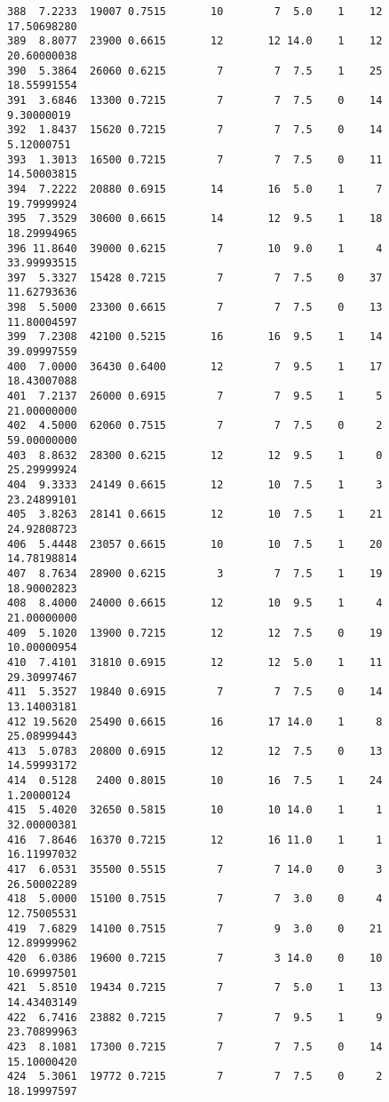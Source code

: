 \documentclass[
  letterpaper,
  DIV=11,
  numbers=noendperiod]{scrreprt}
\begin{document}
\begin{verbatim}
388  7.2233  19007 0.7515       10        7  5.0    1    12 17.50698280
389  8.8077  23900 0.6615       12       12 14.0    1    12 20.60000038
390  5.3864  26060 0.6215        7        7  7.5    1    25 18.55991554
391  3.6846  13300 0.7215        7        7  7.5    0    14  9.30000019
392  1.8437  15620 0.7215        7        7  7.5    0    14  5.12000751
393  1.3013  16500 0.7215        7        7  7.5    0    11 14.50003815
394  7.2222  20880 0.6915       14       16  5.0    1     7 19.79999924
395  7.3529  30600 0.6615       14       12  9.5    1    18 18.29994965
396 11.8640  39000 0.6215        7       10  9.0    1     4 33.99993515
397  5.3327  15428 0.7215        7        7  7.5    0    37 11.62793636
398  5.5000  23300 0.6615        7        7  7.5    0    13 11.80004597
399  7.2308  42100 0.5215       16       16  9.5    1    14 39.09997559
400  7.0000  36430 0.6400       12        7  9.5    1    17 18.43007088
401  7.2137  26000 0.6915        7        7  9.5    1     5 21.00000000
402  4.5000  62060 0.7515        7        7  7.5    0     2 59.00000000
403  8.8632  28300 0.6215       12       12  9.5    1     0 25.29999924
404  9.3333  24149 0.6615       12       10  7.5    1     3 23.24899101
405  3.8263  28141 0.6615       12       10  7.5    1    21 24.92808723
406  5.4448  23057 0.6615       10       10  7.5    1    20 14.78198814
407  8.7634  28900 0.6215        3        7  7.5    1    19 18.90002823
408  8.4000  24000 0.6615       12       10  9.5    1     4 21.00000000
409  5.1020  13900 0.7215       12       12  7.5    0    19 10.00000954
410  7.4101  31810 0.6915       12       12  5.0    1    11 29.30997467
411  5.3527  19840 0.6915        7        7  7.5    0    14 13.14003181
412 19.5620  25490 0.6615       16       17 14.0    1     8 25.08999443
413  5.0783  20800 0.6915       12       12  7.5    0    13 14.59993172
414  0.5128   2400 0.8015       10       16  7.5    1    24  1.20000124
415  5.4020  32650 0.5815       10       10 14.0    1     1 32.00000381
416  7.8646  16370 0.7215       12       16 11.0    1     1 16.11997032
417  6.0531  35500 0.5515        7        7 14.0    0     3 26.50002289
418  5.0000  15100 0.7515        7        7  3.0    0     4 12.75005531
419  7.6829  14100 0.7515        7        9  3.0    0    21 12.89999962
420  6.0386  19600 0.7215        7        3 14.0    0    10 10.69997501
421  5.8510  19434 0.7215        7        7  5.0    1    13 14.43403149
422  6.7416  23882 0.7215        7        7  9.5    1     9 23.70899963
423  8.1081  17300 0.7215        7        7  7.5    0    14 15.10000420
424  5.3061  19772 0.7215        7        7  7.5    0     2 18.19997597

\end{verbatim}
\end{document}

